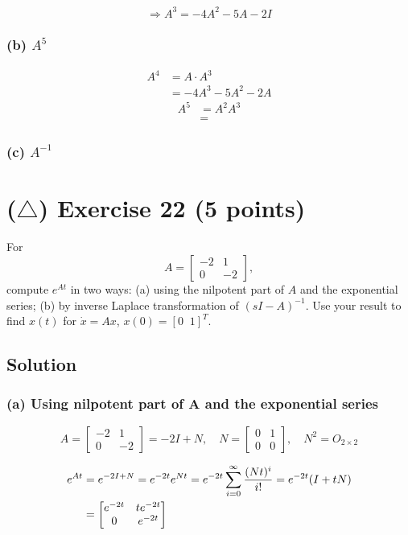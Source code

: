 \documentclass[12pt,a4paper]{article}
\begin{document}
\[
\Rightarrow A^3 = -4A^2 - 5A - 2I 
\]

\subsubsection*{(b) $A^5$}

\begin{align*}
	A^4 &= A\cdot A^3 \\
	&= -4A^3 - 5A^2 - 2A	
\end{align*}
\begin{align*}
	A^5 &= A^2 A^3 \\
		&= 
\end{align*}

\subsubsection*{(c) $A^{-1}$}
\vspace{3cm}
\vfill
\clearpage
\section*{($\triangle$) Exercise 22 \hfill {\normalsize (5 points)}}
For
\[
A=\begin{bmatrix}-2&1\\0&-2\end{bmatrix},
\]
compute $e^{At}$ in two ways: (a) using the nilpotent part of $A$ and the exponential series; (b) by inverse Laplace transformation of $(sI-A)^{-1}$. Use your result to find $x(t)$ for $\dot x=Ax$, $x(0)=[0\;\;1]^T$.
\subsection*{Solution}

\subsubsection*{(a) Using nilpotent part of A and the exponential series}


\[
A = \begin{bmatrix}
	-2 & 1 \\ 0 & -2
\end{bmatrix} = -2I + N ,\quad N = \begin{bmatrix}
0 & 1 \\ 0 & 0
\end{bmatrix}, \quad N^2 = O_{2\times2}
\]

\begin{align*}
e^{At} &= e^{-2I + N} = e^{-2t} e^{Nt} = e^{-2t} \sum_{i = 0}^\infty { (Nt)^i\over i!} = e^{-2t} (I + tN) \\
&= \begin{bmatrix}
	e^{-2t} & te^{-2t} \\
	0 & e^{-2t}
\end{bmatrix} 
\end{align*}
\vspace{1cm}
\end{document}
